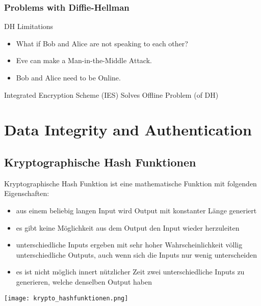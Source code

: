 \subsubsection{Problems with Diffie-Hellman}

\begin{concept}{DH Limitations}
    \begin{itemize}
        \item What if Bob and Alice are not speaking to each other?
        \item Eve can make a Man-in-the-Middle Attack.
        \item Bob and Alice need to be Online.
    \end{itemize}
\end{concept}


\begin{concept}{Integrated Encryption Scheme (IES)}
    Solves Offline Problem (of DH)
\end{concept}

\raggedcolumns
\columnbreak

\section{Data Integrity and Authentication}



\subsection{Kryptographische Hash Funktionen}

\begin{definition}{Kryptographische Hash Funktion} ist eine mathematische Funktion mit folgenden Eigenschaften:
    \begin{itemize}
        \item aus einem beliebig langen Input wird Output mit konstanter Länge generiert
        \item es gibt keine Möglichkeit aus dem Output den Input wieder herzuleiten
        \item unterschiedliche Inputs ergeben mit sehr hoher Wahrscheinlichkeit völlig unterschiedliche Outputs, auch wenn sich die Inputs nur wenig unterscheiden
        \item es ist nicht möglich innert nützlicher Zeit zwei unterschiedliche Inputs zu generieren, welche denselben Output haben
    \end{itemize}

    \texttt{[image: krypto\_hashfunktionen.png]}
    
\end{definition}

